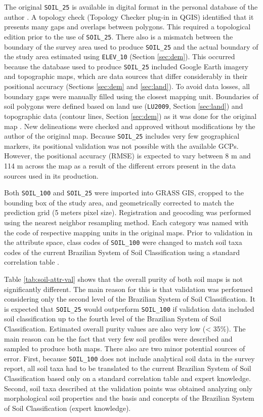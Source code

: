 The original \texttt{SOIL\_25} is available in digital format in the personal database of the author \cite{Miguel2010}. A topology check (Topology Checker plug-in in QGIS) identified that it presents many gaps and overlaps between polygons. This required a topological edition prior to the use of \texttt{SOIL\_25}. There also is a mismatch between the boundary of the survey area used to produce \texttt{SOIL\_25} and the actual boundary of the study area estimated using \texttt{ELEV\_10} (Section \ref{sec:dem}). This occurred because the database used to produce \texttt{SOIL\_25} included Google Earth imagery\textregistered{} and topographic maps, which are data sources that differ considerably in their positional accuracy (Sections \ref{sec:dem} and \ref{sec:land}). To avoid data losses, all boundary gaps were manually filled using the closest mapping unit. Boundaries of soil polygons were defined based on land use (\texttt{LU2009}, Section \ref{sec:land}) and topographic data (contour lines, Section \ref{sec:dem}) as it was done for the original map \cite{Miguel2010}. New delineations were checked and approved without modifications by the author of the original map. Because \texttt{SOIL\_25} includes very few geographical markers, its positional validation was not possible with the available GCPs. However, the positional accuracy (RMSE) is expected to vary between 8 m and 114 m across the map as a result of the different errors present in the data sources used in its production.

Both \texttt{SOIL\_100} and \texttt{SOIL\_25} were imported into GRASS GIS, cropped to the bounding box of the study area, and geometrically corrected to match the prediction grid (5 meters pixel size). Registration and geocoding was performed using the nearest neighbor resampling method. Each category was named with the code of respective mapping units in the original maps. Prior to validation in the attribute space, class codes of \texttt{SOIL\_100} were changed to match soil taxa codes of the current Brazilian System of Soil Classification using a standard correlation table \cite{SantosEtAl2006}.

Table \ref{tab:soil-attr-val} shows that the overall purity of both soil maps is not significantly different. The main reason for this is that validation was performed considering only the second level of the Brazilian System of Soil Classification. It is expected that \texttt{SOIL\_25} would outperform \texttt{SOIL\_100} if validation data included soil classification up to the fourth level of the Brazilian System of Soil Classification. Estimated overall purity values are also very low (< 35\%). The main reason can be the fact that very few soil profiles were described and sampled to produce both maps. There also are two minor potential sources of error. First, because \texttt{SOIL\_100} does not include analytical soil data in the survey report, all soil taxa had to be translated to the current Brazilian System of Soil Classification based only on a standard correlation table \cite{SantosEtAl2006} and expert knowledge. Second, soil taxa described at the validation points was obtained analyzing only morphological soil properties and the basis and concepts of the Brazilian System of Soil Classification (expert knowledge).

